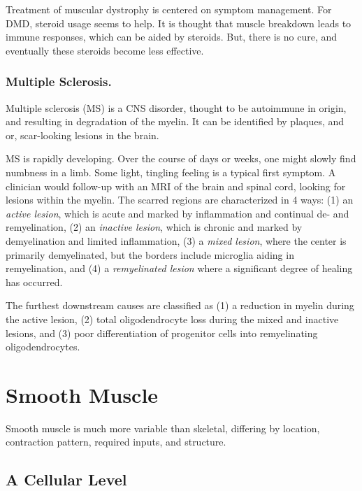 Treatment of muscular dystrophy is centered on symptom management. For DMD, steroid usage seems to help. It is thought that muscle breakdown leads to immune responses, which can be aided by steroids. But, there is no cure, and eventually these steroids become less effective. 

\subsubsection{Multiple Sclerosis.}

\label{sec:MSdigression}

Multiple sclerosis (MS) is a CNS disorder, thought to be autoimmune in origin, and resulting in degradation of the myelin. It can be identified by plaques, and or, scar-looking lesions in the brain.\newline

MS is rapidly developing. Over the course of days or weeks, one might slowly find numbness in a limb. Some light, tingling feeling is a typical first symptom. A clinician would follow-up with an MRI of the brain and spinal cord, looking for lesions within the myelin. The scarred regions are characterized in 4 ways: (1) an \textit{active lesion}, which is acute and marked by inflammation and continual de- and remyelination, (2) an \textit{inactive lesion}, which is chronic and marked by demyelination and limited inflammation, (3) a \textit{mixed lesion}, where the center is primarily demyelinated, but the borders include microglia aiding in remyelination, and (4) a \textit{remyelinated lesion} where a significant degree of healing has occurred.\newline

The furthest downstream causes are classified as (1) a reduction in myelin during the active lesion, (2) total oligodendrocyte loss during the mixed and inactive lesions, and (3) poor differentiation of progenitor cells into remyelinating oligodendrocytes. 



\section{Smooth Muscle}

Smooth muscle is much more variable than skeletal, differing by location, contraction pattern, required inputs, and structure. 


\subsection{A Cellular Level}
